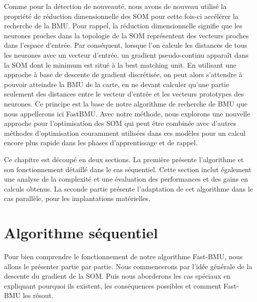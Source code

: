 	Comme pour la détection de nouveauté, nous avons de nouveau utilisé la propriété de réduction dimensionnelle des SOM pour cette fois-ci accélérer la recherche de la BMU. Pour rappel, la réduction dimensionnelle signifie que les neurones proches dans la topologie de la SOM représentent des vecteurs proches dans l'espace d'entrée. Par conséquent, lorsque l'on calcule les distances de tous les neurones avec un vecteur d'entrée, un gradient pseudo-continu apparaît dans la SOM dont le minimum est situé à la best matching unit. En utilisant une approche à base de descente de gradient discrétisée, on peut alors s'attendre à pouvoir atteindre la BMU de la carte, en ne devant calculer qu'une partie seulement des distances entre le vecteur d'entrée et les vecteurs prototypes des neurones. Ce principe est la base de notre algorithme de recherche de BMU que nous appellerons ici FastBMU. Avec notre méthode, nous explorons une nouvelle approche pour l'optimisation des SOM qui peut être combinée avec d'autres méthodes d'optimisation couramment utilisées dans ces modèles pour un calcul encore plus rapide dans les phases d'apprentissage et de rappel.

	Ce chapitre est découpé en deux sections. La première présente l'algorithme et son fonctionnement détaillé dans le cas séquentiel. Cette section inclut également une analyse de la complexité et une évaluation des performances et des gains en calculs obtenus. La seconde partie présente l'adaptation de cet algorithme dans le cas parallèle, pour les implantations matérielles.

	\newpage

	\section{Algorithme séquentiel}\label{sec:fast:seq}

	Pour bien comprendre le fonctionnement de notre algorithme Fast-BMU, nous allons le présenter partie par partie. Nous commencerons par l'idée générale de la descente du gradient de la SOM. Puis nous aborderons les cas spéciaux en expliquant pourquoi ils existent, les conséquences possibles et comment Fast-BMU les résout.

